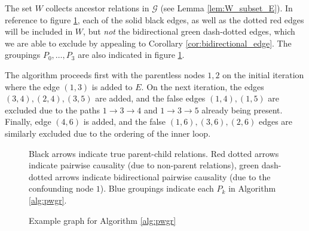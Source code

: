 \documentclass[12pt]{article}
\def\gcg{\mathcal{G}}  %
\begin{document}
\begin{example}
  The set $W$ collects ancestor relations in $\gcg$ (see Lemma
  \ref{lem:W_subset_E}).  In reference to figure
  \ref{fig:example_fig3}, each of the solid black edges, as well as
  the dotted red edges will be included in $W$, but \textit{not} the
  bidirectional green dash-dotted edges, which we are able to exclude
  by appealing to Corollary \ref{cor:bidirectional_edge}.  The
  groupings $P_0, \ldots, P_3$ are also indicated in figure
  \ref{fig:example_fig3}.

  The algorithm proceeds first with the parentless nodes $1, 2$ on the
  initial iteration where the edge $(1, 3)$ is added to $E$.  On the
  next iteration, the edges $(3, 4), (2, 4), (3, 5)$ are added, and
  the false edges $(1, 4), (1, 5)$ are excluded due to the paths
  $1 \rightarrow 3 \rightarrow 4$ and $1 \rightarrow 3 \rightarrow 5$
  already being present.  Finally, edge $(4, 6)$ is added, and the false
  $(1, 6), (3, 6), (2, 6)$ edges are similarly excluded due to the
  ordering of the inner loop.
  
  \begin{figure}
    \centering
    \caption{Example graph for Algorithm \ref{alg:pwgr}}
    \footnotesize{Black arrows indicate true parent-child
      relations.  Red dotted arrows indicate pairwise causality (due to
      non-parent relations), green dash-dotted arrows indicate
      bidirectional pairwise causality (due to the confounding node
      $1$).  Blue groupings indicate each $P_k$ in Algorithm
      \ref{alg:pwgr}.}
    \label{fig:example_fig3}
    

\end{figure}
\end{example}
\end{document}
